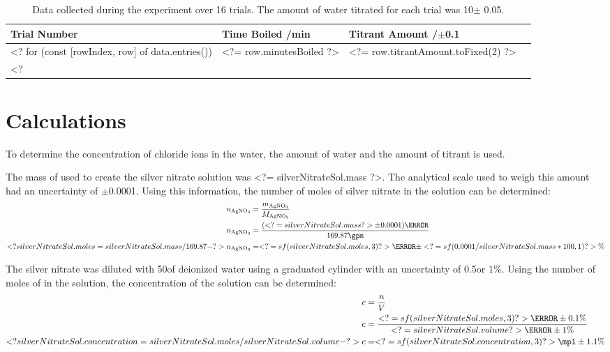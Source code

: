 \documentclass[11pt]{article}
\begin{document}
\begin{table}[H]
	\caption{Data collected during the experiment over 16 trials. The amount of water titrated for each trial was 10\ml $\pm$ 0.05\ml .}
	\def\arraystretch{1.2}
	\begin{tabularx}{\linewidth}{|
			>{\RaggedRight}X|
			>{\RaggedRight}X|
			>{\RaggedRight}X|
			>{\RaggedRight}X|
		}
		\hline
		\textbf{Trial Number}              &
		\textbf{Time Boiled} /\si{\minute} &
		\textbf{Titrant Amount} /$\pm$0.1\ml
		\\\hline
		<? for (const [rowIndex, row] of data.entries()) { ?>
			Trial <?= rowIndex + 1 ?>
			& <?= row.minutesBoiled ?>
			& <?= row.titrantAmount.toFixed(2) ?>
			\\\hline
		<? } ?>
	\end{tabularx}
\end{table}

\section{Calculations}

To determine the concentration of chloride ions in the water, the amount of water and the amount of titrant is used.

The mass of  used to create the silver nitrate solution was <?= silverNitrateSol.mass ?>\g. The analytical scale used to weigh this amount had an uncertainty of $\pm$0.0001\g. Using this information, the number of moles of silver nitrate in the solution can be determined:
%
\begin{align*}
	n_{\ce{AgNO3}} & = \frac{m_{\ce{AgNO3}}}{M_{\ce{AgNO3}}}
	\\
	n_{\ce{AgNO3}} & = \frac{(<?= silverNitrateSol.mass ?> \pm 0.0001)\g}{169.87\gpm}
	\\
	<? silverNitrateSol.moles = silverNitrateSol.mass / 169.87 -?>
	n_{\ce{AgNO3}} & = <?= sf(silverNitrateSol.moles, 3) ?>\mol \pm <?= sf(0.0001 / silverNitrateSol.mass * 100, 1) ?>\%
\end{align*}

The silver nitrate was diluted with 50\ml of deionized water using a graduated cylinder with an uncertainty of 0.5\ml or 1\%. Using the number of moles of  in the solution, the concentration of the solution can be determined:
%
\begin{align*}
	c & = \frac{n}{V}
	\\
	c & = \frac{<?= sf(silverNitrateSol.moles, 3) ?>\mol \pm 0.1\%}{<?= silverNitrateSol.volume ?>\litre \pm 1\%}
	\\
	<? silverNitrateSol.concentration = silverNitrateSol.moles / silverNitrateSol.volume -?>
	c & = <?= sf(silverNitrateSol.concentration, 3) ?>\mpl \pm 1.1\%
\end{align*}
\end{document}

